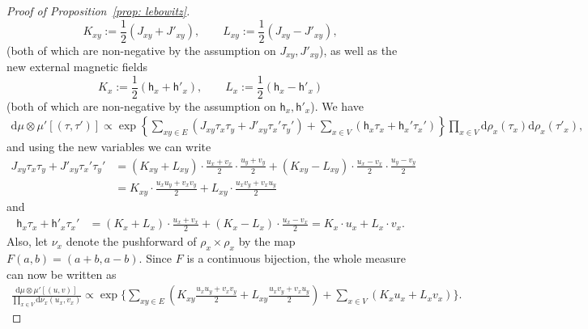 \documentclass[10pt,a4paper]{amsart}
\begin{document}
\begin{proof}[Proof of Proposition~\textup{\ref{prop: lebowitz}}]
\begin{equation}
K_{xy} := \frac{1}{2}(J_{xy} + J'_{xy}), \qquad L_{xy} := \frac{1}{2}(J_{xy} - J'_{xy}),
\end{equation}
(both of which are non-negative by the assumption on $J_{xy}, J'_{xy}$), as well as the new external magnetic fields
\begin{equation}
K_x:=\frac{1}{2}(\mathsf{h}_x+\mathsf{h}'_x), \qquad L_x:= \frac{1}{2}(\mathsf{h}_x-\mathsf{h}'_x)
\end{equation}
(both of which are non-negative by the assumption on $\mathsf{h}_x,\mathsf{h}'_x$).
We have 
\begin{align*}
   \mathrm{d}\mu\otimes \mu'[(\tau, \tau')] \propto \exp\left\{ \sum_{xy\in E} (J_{xy} \tau_x \tau_y +J'_{xy}\tau_x'\tau_y') +\sum_{x\in V} (\mathsf{h}_x\tau_x+\mathsf{h}_x'\tau_x') \right\}\prod_{x\in V}\mathrm{d}\rho_x(\tau_x)\mathrm{d}\rho_x(\tau'_x),
\end{align*}
and using the new variables we can write 
\begin{align*}
J_{xy} \tau_x \tau_y +J'_{xy}\tau_x'\tau_y'
&=
(K_{xy}+L_{xy})\cdot \frac{u_x+v_x}{2}\cdot\frac{u_y+v_y}{2}+(K_{xy}-L_{xy})\cdot \frac{u_x-v_x}{2}\cdot\frac{u_y-v_y}{2}
\\&=
K_{xy}\cdot \frac{u_xu_y+v_xv_y}{2}+L_{xy}\cdot \frac{u_xv_y+v_xu_y}{2}
\end{align*}
and
\begin{align*}
\mathsf{h}_x \tau_x +\mathsf{h}'_x\tau_x'
&=
(K_x+L_x)\cdot \frac{u_x+v_x}{2}+(K_x-L_x)\cdot \frac{u_x-v_x}{2}=
K_x\cdot u_x+L_x\cdot v_x.
\end{align*}
Also, let $\nu_x$ denote the pushforward of $\rho_x\times \rho_x$ by the map $F(a,b)=\left(a+b,a-b\right)$.
Since $F$ is a continuous bijection, the whole measure can now be written as 
\begin{align}
\frac{\mathrm{d}\mu\otimes \mu'[(u, v)]}{\prod_{x\in V}\mathrm{d}\nu_x(u_x,v_x)}\propto \exp\Biggl\{\sum_{xy\in E} \left(K_{xy} \frac{u_xu_y+v_xv_y}{2}+L_{xy} \frac{u_xv_y+v_xu_y}{2}\right) +\sum_{x\in V}(K_xu_x+L_xv_x)\Biggr\}.
\end{align}




\end{proof}
\end{document}
